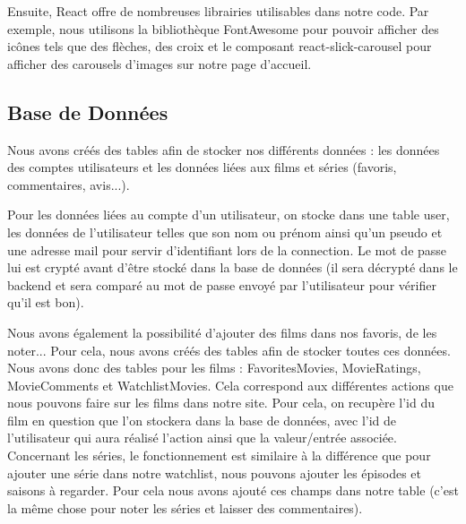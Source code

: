 \documentclass[a4paper]{article}
\begin{document}
Ensuite, React offre de nombreuses librairies utilisables dans notre code. Par exemple, nous utilisons la bibliothèque FontAwesome pour pouvoir afficher des icônes tels que des flèches, des croix et le composant react-slick-carousel pour afficher des carousels d'images sur notre page d'accueil. 

\subsection{Base de Données}
Nous avons créés des tables afin de stocker nos différents données : les données des comptes utilisateurs et les données liées aux films et séries (favoris, commentaires, avis...).

Pour les données liées au compte d'un utilisateur, on stocke dans une table user, les données de l'utilisateur telles que son nom ou prénom ainsi qu'un pseudo et une adresse mail pour servir d'identifiant lors de la connection. Le mot de passe lui est crypté avant d'être stocké dans la base de données (il sera décrypté dans le backend et sera comparé au mot de passe envoyé par l'utilisateur pour vérifier qu'il est bon).


Nous avons également la possibilité d'ajouter des films dans nos favoris, de les noter... Pour cela, nous avons créés des tables afin de stocker toutes ces données. Nous avons donc des tables pour les films : FavoritesMovies, MovieRatings, MovieComments et WatchlistMovies. Cela correspond aux différentes actions que nous pouvons faire sur les films dans notre site. Pour cela, on recupère l'id du film en question que l'on stockera dans la base de données, avec l'id de l'utilisateur qui aura réalisé l'action ainsi que la valeur/entrée associée. Concernant les séries, le fonctionnement est similaire à la différence que pour ajouter une série dans notre watchlist, nous pouvons ajouter les épisodes et saisons à regarder. Pour cela nous avons ajouté ces champs dans notre table (c'est la même chose pour noter les séries et laisser des commentaires).
\end{document}
